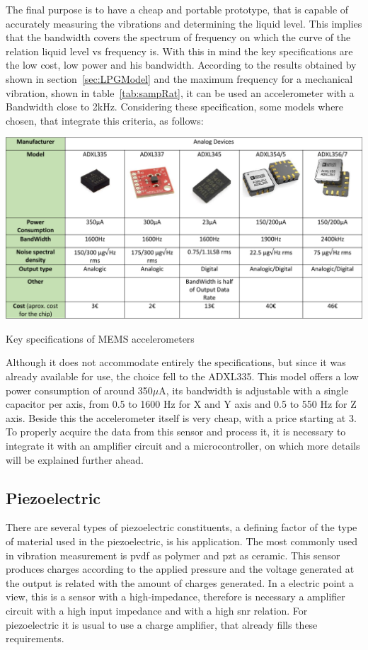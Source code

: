 The final purpose is to have a cheap and portable prototype, that is capable of accurately measuring the vibrations and determining the liquid level. This implies that the bandwidth covers the spectrum of frequency on which the curve of the relation liquid level vs frequency is. With this in mind the key specifications are the low cost, low power and his bandwidth. According to the results obtained by~\citeauthor{wuLiquidLevelDetector2014b}\cite{wuLiquidLevelDetector2014b} shown in section~\ref{sec:LPGModel} and the maximum frequency for a mechanical vibration, shown in table~\ref{tab:sampRat}, it can be used an accelerometer with a Bandwidth close to 2kHz. Considering these specification, some models where chosen, that integrate this criteria, as follows:
\begin{table}
    \centering
    \includegraphics[width=1\textwidth]{Chapters/4CHP/Figures/accTable.pdf}
    \caption{Key specifications of MEMS accelerometers}
    \label{tab:acctable}
\end{table}

Although it does not accommodate entirely the specifications, but since it was already available for use, the choice fell to the ADXL335. This model offers a low power consumption of around 350$\mu$A, its bandwidth is adjustable with a single capacitor per axis, from 0.5 to 1600 Hz for X and Y axis and 0.5 to 550 Hz for Z axis. Beside this the accelerometer itself is very cheap, with a price starting at 3\€. To properly acquire the data from this sensor and process it, it is necessary to integrate it with an amplifier circuit and a microcontroller, on which more details will be explained further ahead.
\subsection{Piezoelectric}

There are several types of piezoelectric constituents, a defining factor of the type of material used in the piezoelectric, is his application. The most commonly used in vibration measurement is \acrshort{pvdf} as polymer and \acrshort{pzt} as ceramic. This sensor produces charges according to the applied pressure and the voltage generated at the output is related with the amount of charges generated. In a electric point a view, this is a sensor with a high-impedance, therefore is necessary a amplifier circuit with a high input impedance and with a high \acrshort{snr} relation. For piezoelectric it is usual to use a charge amplifier, that already fills these requirements.


